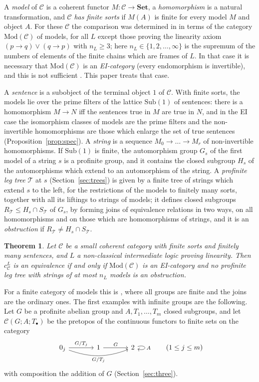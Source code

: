 \documentclass[11pt]{amsart}
\newtheorem{thm}{Theorem}[section]
\theoremstyle{definition}
\newcommand{\Set}{\mathbf{Set}}
\newcommand{\Sub}{\mathrm{Sub}}
\newcommand{\Mod}{\mathrm{Mod}}
\newcommand{\cC}{\mathcal C}
\begin{document}
A \emph{model} of $\cC$ is a coherent functor $M\colon\cC\to\Set$, a
\emph{homomorphism} is a natural transformation, and $\cC$ \emph{has
finite sorts} if $M(A)$ is finite for every model $M$ and object $A$.
For these $\cC$ the comparison was determined in \cite{Finsorts} in
terms of the category $\Mod(\cC)$ of models, for all $L$ except those
proving the linearity axiom $(p\to q)\vee(q\to p)$ with $n_L\ge3$; here
$n_L\in\{1,2,\dots,\infty\}$ is the supremum of the numbers of
elements of the finite chains which are frames of $L$. In that case it
is necessary that $\Mod(\cC)$ is an \emph{EI-category} (every
endomorphism is invertible), and this is not sufficient
\cite{Strings}. This paper treats that case.

A \emph{sentence} is a subobject of the terminal object $1$ of $\cC$.
With finite sorts, the models lie over the prime filters of the
lattice $\Sub(1)$ of sentences: there is a homomorphism $M\to N$ iff
the sentences true in $M$ are true in $N$, and in the EI case the
isomorphism classes of models are the prime filters and the
non-invertible homomorphisms are those which enlarge the set of true
sentences (Proposition~\ref{prop:spec}). A \emph{string} is a sequence
$M_0\to\dots\to M_r$ of non-invertible homomorphisms. If $\Sub(1)$ is
finite, the automorphism group $G_s$ of the first model of a string
$s$ is a profinite group, and it contains the closed subgroup $H_s$ of
the automorphisms which extend to an automorphism of the string. A
\emph{profinite leg tree} $\mathcal T$ at $s$ (Section~\ref{sec:trees})
is given by a finite tree of strings which extend $s$ to the left, for
the restrictions of the models to finitely many sorts, together with
all its liftings to strings of models; it
defines closed subgroups $R_{\mathcal T}\le H_s\cap S_{\mathcal T}$ of
$G_s$, by forming joins of equivalence relations in two ways, on all
homomorphisms and on those which are homomorphisms of strings, and it
is an \emph{obstruction} if $R_{\mathcal T}\ne H_s\cap S_{\mathcal T}$.

\begin{thm}\label{thm:A}
Let $\cC$ be a small coherent category with finite sorts and finitely
many sentences, and $L$ a non-classical intermediate logic proving
linearity. Then $c^L_\cC$ is an equivalence if and
only if $\Mod(\cC)$ is an EI-category and no profinite leg tree with
strings of at most $n_L$ models is an obstruction.
\end{thm}

For a finite category of models this is \cite[Thm.~6.15]{Strings},
where all groups are finite and the joins are the ordinary ones. The
first examples with infinite groups are the following. Let $G$ be a
profinite abelian group and $A,T_1,\dots,T_m$ closed subgroups, and
let $\cC(G;A;T_\bullet)$ be the pretopos of the continuous functors to
finite sets on the category
\[
\begin{tikzcd}[column sep=large]
0_j\ar[r,"G/T_j"]\ar[rr,bend right=20,"G/T_j"']&1\ar[r,"G"]&2\ar[loop right,"A"]
\end{tikzcd}\qquad(1\le j\le m)
\]
with composition the addition of $G$ (Section~\ref{sec:three}).
\end{document}
